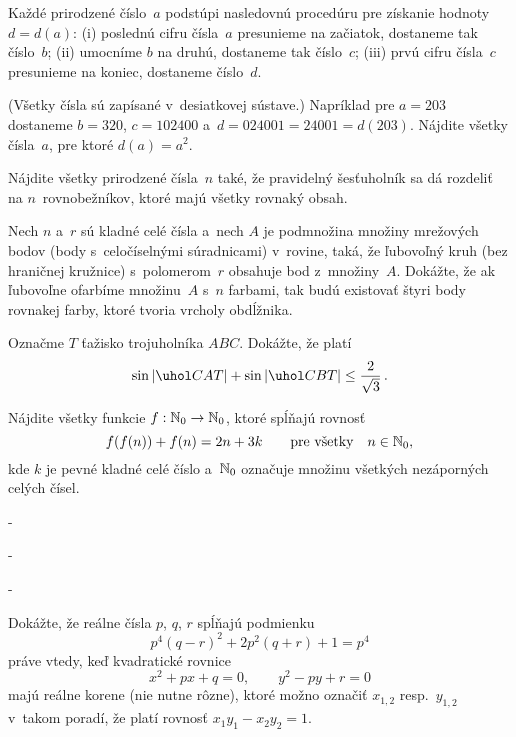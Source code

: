 {%
Každé prirodzené číslo~$a$ podstúpi nasledovnú procedúru pre získanie hodnoty $d=d(a)$:
\ite (i) poslednú cifru čísla~$a$ presunieme na začiatok, dostaneme tak číslo~$b$;
\ite (ii) umocníme $b$ na druhú, dostaneme tak číslo~$c$;
\ite (iii) prvú cifru čísla~$c$ presunieme na koniec, dostaneme číslo~$d$.

(Všetky čísla sú zapísané v~desiatkovej sústave.) Napríklad pre $a=203$ dostaneme $b=320$, $c=102400$ a~$d=024001=24001=d(203)$. Nájdite všetky čísla~$a$, pre ktoré $d(a)=a^2$.}

{%
Nájdite všetky prirodzené čísla~$n$ také, že pravidelný šesťuholník sa dá rozdeliť na $n$~rovnobežníkov, ktoré majú všetky rovnaký obsah.}

{%
Nech $n$ a~$r$ sú kladné celé čísla a~nech $A$ je podmnožina množiny mrežových bodov (body s~celočíselnými súradnicami) v~rovine, taká, že ľubovoľný kruh (bez hraničnej kružnice) s~polomerom~$r$
obsahuje bod z~množiny~$A$.
Dokážte, že ak ľubovoľne ofarbíme množinu~$A$ s~$n$ farbami, tak budú existovať štyri body rovnakej
farby, ktoré tvoria vrcholy obdĺžnika.}

{%
Označme $T$ ťažisko trojuholníka $ABC$. Dokážte, že platí
$$
\sin{|\uhol CAT|} + \sin{|\uhol CBT|} \leq \frac{2}{\sqrt{3}} \,.
$$}

{%
Nájdite všetky funkcie $f: \Bbb N_0 \rightarrow \Bbb N_0$, ktoré spĺňajú rovnosť
$$
f(f(n)) + f(n) = 2n + 3k \qquad \text{pre všetky} \quad n \in \Bbb N_0,
$$
kde $k$ je pevné kladné celé číslo a~$\Bbb N_0$ označuje množinu všetkých nezáporných celých čísel.}

{%
-}
\podpis{-:-}

{%
-}
\podpis{-:-}

{%
-}
\podpis{-:-}

{%
Dokážte, že reálne čísla $p$, $q$, $r$ spĺňajú podmienku
$$
p^4(q-r)^2+2p^2(q+r)+1=p^4
$$
práve vtedy, keď kvadratické rovnice
$$
x^2+px+q=0,\qquad y^2-py+r=0
$$
majú reálne korene (nie nutne rôzne), ktoré možno označiť
$x_{1,2}$ resp.~$y_{1,2}$ v~takom poradí, že platí rovnosť
$x_1y_1-x_2y_2=1$.}

